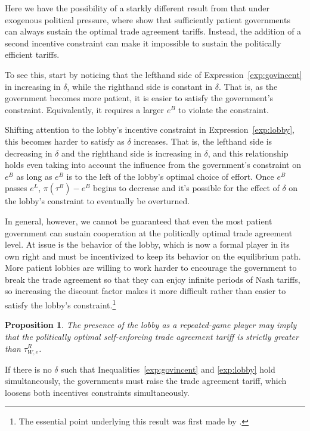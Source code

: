 \documentclass[12pt]{article}
\newtheorem{proposition}{Proposition}
\newcommand{\de}{\delta}
\begin{document}
Here we have the possibility of a starkly different result from that under exogenous political pressure, where \Textcite{bs2005} show that sufficiently patient governments can always sustain the optimal trade agreement tariffs. Instead, the addition of a second incentive constraint can make it impossible to sustain the politically efficient tariffs.

To see this, start by noticing that the lefthand side of Expression~\ref{exp:govincent} in increasing in $\de$, while the righthand side is constant in $\de$. That is, as the government becomes more patient, it is easier to satisfy the government's constraint. Equivalently, it requires a larger $e^B$ to violate the constraint.

Shifting attention to the lobby's incentive constraint in Expression~\ref{exp:lobby}, this becomes harder to satisfy as $\de$ increases. That is, the lefthand side is decreasing in $\de$ and the righthand side is increasing in $\de$, and this relationship holds even taking into account the influence from the government's constraint on $e^B$ as long as $e^B$ is to the left of the lobby's optimal choice of effort. Once $e^B$ passes $e^L$, $\pi(\tau^B) - e^B$ begins to decrease and it's possible for the effect of $\de$ on the lobby's constraint to eventually be overturned.

In general, however, we cannot be guaranteed that even the most patient government can sustain cooperation at the politically optimal trade agreement level. At issue is the behavior of the lobby, which is now a formal player in its own right and must be incentivized to keep its behavior on the equilibrium path. More patient lobbies are willing to work harder to encourage the government to break the trade agreement so that they can enjoy infinite periods of Nash tariffs, so increasing the discount factor makes it more difficult rather than easier to satisfy the lobby's constraint.\footnote{The essential point underlying this result was first made by \Textcite{buzard2013a}.}

\begin{proposition}
  The presence of the lobby as a repeated-game player may imply that the politically optimal self-enforcing trade agreement tariff is strictly greater than $\tau^R_{W,e}$. 
\end{proposition}

If there is no $\de$ such that Inequalities~\ref{exp:govincent} and \ref{exp:lobby} hold simultaneously, the governments must raise the trade agreement tariff, which loosens both incentives constraints simultaneously.
\end{document}
